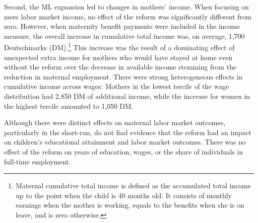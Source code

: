Second, the ML expansion led to changes in mothers' income. When focusing on mere labor market income, no effect of the reform was significantly different from zero. However, when maternity benefit payments were included in the income measure, the overall increase in cumulative total income was, on average, 1,700 Deutschmarks (DM).\footnote{Maternal cumulative total income is defined as the accumulated total income up to the point when the child is 40 months old. It consists of monthly earnings when the mother is working, equals to the benefits when she is on leave, and is zero otherwise.} This increase was the result of a dominating effect of unexpected extra income for mothers who would have stayed at home even without the reform over the decrease in available income stemming from the reduction in maternal employment. There were strong heterogeneous effects in cumulative income across wages: Mothers in the lowest tercile of the wage distribution had 2,850 DM of additional income, while the increase for women in the highest tercile amounted to 1,050 DM. 


Although there were distinct effects on maternal labor market outcomes, particularly in the short-run, \cite{Dustmann2012} do not find evidence that the reform had an impact on children's educational attainment and labor market outcomes. There was no effect of the reform on years of education, wages, or the share of individuals in full-time employment.





 
















